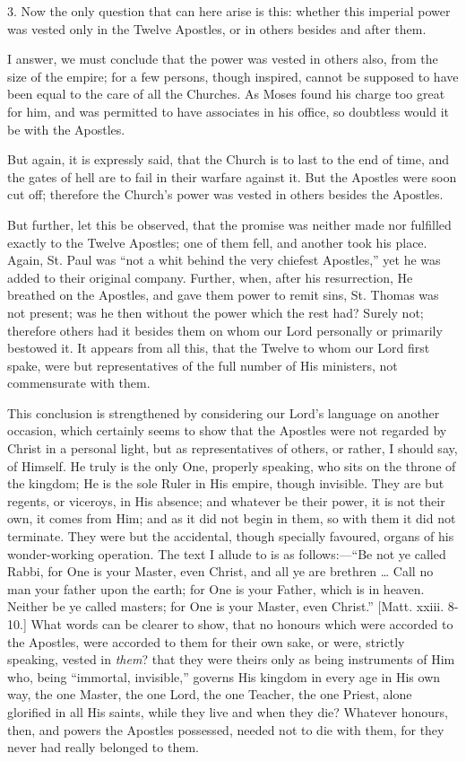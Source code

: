 3. Now the only question that can here arise is this: whether this
imperial power was vested only in the Twelve Apostles, or in others
besides and after them.

I answer, we must conclude that the power was vested in others
also, from the size of the empire; for a few persons, though inspired,
cannot be supposed to have been equal to the care of all the Churches.
As Moses found his charge too great for him, and was permitted to have
associates in his office, so doubtless would it be with the Apostles.

But again, it is expressly said, that the Church is to last to the
end of time, and the gates of hell are to fail in their warfare
against it. But the Apostles were soon cut off; therefore the Church's
power was vested in others besides the Apostles.

But further, let this be observed, that the promise was neither
made nor fulfilled exactly to the Twelve Apostles; one of them fell,
and another took his place. Again, St. Paul was ``not a whit
behind the very chiefest Apostles,'' yet he was added to their
original company. Further, when, after his resurrection, He breathed
on the Apostles, and gave them power to remit sins, St. Thomas was not
present; was he then without the power which the rest had? Surely not;
therefore others had it besides them on whom our Lord personally or
primarily bestowed it. It appears from all this, that the Twelve to
whom our Lord first spake, were but representatives of the full number
of His ministers, not commensurate with them.

This conclusion is strengthened by considering our Lord's language
on another occasion, which certainly seems to show that the Apostles
were not regarded by Christ in a personal light, but as
representatives of others, or rather, I should say, of Himself. He
truly is the only One, properly speaking, who sits on the throne of
the kingdom; He is the sole Ruler in His empire, though invisible.
They are but regents, or viceroys, in His absence; and whatever be
their power, it is not their own, it comes from Him; and as it did not
begin in them, so with them it did not terminate. They were but the
accidental, though specially favoured, organs of his wonder-working
operation. The text I allude to is as follows:—``Be not ye
called Rabbi, for One is your Master, even Christ, and all ye are
brethren … Call no man your father upon the earth; for One is your
Father, which is in heaven. Neither be ye called masters; for One is
your Master, even Christ.'' [Matt. xxiii. 8-10.] What words can be
clearer to show, that no honours which were accorded to the Apostles,
were accorded to them for their own sake, or were, strictly speaking,
vested in \emph{them}? that they were theirs only as being instruments
of Him who, being ``immortal, invisible,'' governs His kingdom
in every age in His own way, the one Master, the one Lord, the one
Teacher, the one Priest, alone glorified in all His saints, while they
live and when they die? Whatever honours, then, and powers the
Apostles possessed, needed not to die with them, for they never had
really belonged to them.

